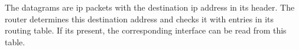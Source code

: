 The datagrams are ip packets with the destination ip address in its header. The router determines this destination address and checks it with entries in its routing table. If its present, the corresponding interface can be read from this table.
